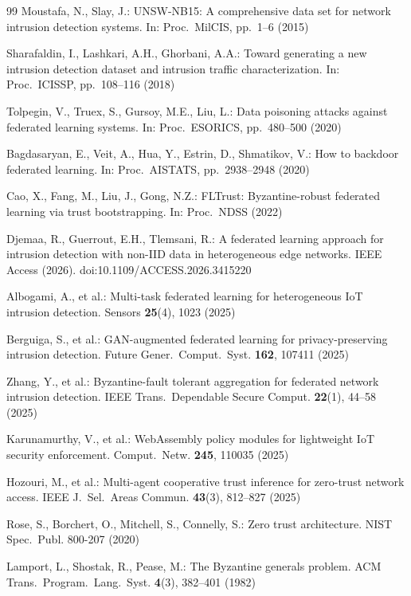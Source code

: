 \documentclass[iicol,sn-mathphys,Numbered]{sn-jnl}
\begin{document}
\begin{thebibliography}{99}
Moustafa, N., Slay, J.:
UNSW-NB15: A comprehensive data set for network intrusion detection systems.
In: Proc.\ MilCIS, pp.\ 1--6 (2015)

Sharafaldin, I., Lashkari, A.H., Ghorbani, A.A.:
Toward generating a new intrusion detection dataset and intrusion traffic characterization.
In: Proc.\ ICISSP, pp.\ 108--116 (2018)

Tolpegin, V., Truex, S., Gursoy, M.E., Liu, L.:
Data poisoning attacks against federated learning systems.
In: Proc.\ ESORICS, pp.\ 480--500 (2020)

Bagdasaryan, E., Veit, A., Hua, Y., Estrin, D., Shmatikov, V.:
How to backdoor federated learning.
In: Proc.\ AISTATS, pp.\ 2938--2948 (2020)

Cao, X., Fang, M., Liu, J., Gong, N.Z.:
FLTrust: Byzantine-robust federated learning via trust bootstrapping.
In: Proc.\ NDSS (2022)

Djemaa, R., Guerrout, E.H., Tlemsani, R.:
A federated learning approach for intrusion detection with non-IID data in heterogeneous edge networks.
IEEE Access (2026). doi:10.1109/ACCESS.2026.3415220

Albogami, A., et al.:
Multi-task federated learning for heterogeneous IoT intrusion detection.
Sensors \textbf{25}(4), 1023 (2025)

Berguiga, S., et al.:
GAN-augmented federated learning for privacy-preserving intrusion detection.
Future Gener.\ Comput.\ Syst. \textbf{162}, 107411 (2025)

Zhang, Y., et al.:
Byzantine-fault tolerant aggregation for federated network intrusion detection.
IEEE Trans.\ Dependable Secure Comput. \textbf{22}(1), 44--58 (2025)

Karunamurthy, V., et al.:
WebAssembly policy modules for lightweight IoT security enforcement.
Comput.\ Netw. \textbf{245}, 110035 (2025)

Hozouri, M., et al.:
Multi-agent cooperative trust inference for zero-trust network access.
IEEE J.\ Sel.\ Areas Commun. \textbf{43}(3), 812--827 (2025)

Rose, S., Borchert, O., Mitchell, S., Connelly, S.:
Zero trust architecture.
NIST Spec.\ Publ. 800-207 (2020)

Lamport, L., Shostak, R., Pease, M.:
The Byzantine generals problem.
ACM Trans.\ Program.\ Lang.\ Syst. \textbf{4}(3), 382--401 (1982)

\end{thebibliography}
\end{document}
